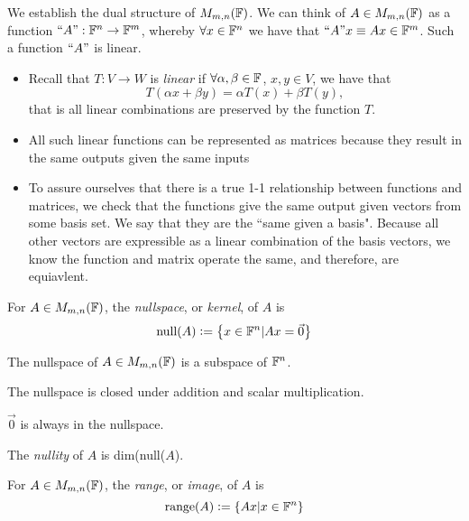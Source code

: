 \newpage

\noindent We establish the dual structure of $M_{m,n}(\mathbb F)$. We can think of $A \in M_{m,n}(\mathbb F)$ as a function $``A": \mathbb F^n \rightarrow \mathbb F^m$, whereby $\forall x \in \mathbb F^n$ we have that $``A"x \equiv Ax \in \mathbb F^m$. Such a function $``A"$ is linear.
\begin{itemize}
    \item Recall that $T: V \rightarrow W$ is \textit{linear} if $\forall \alpha, \beta \in \mathbb F$, $x, y \in V$, we have that
    $$
    T(\alpha x + \beta y) = \alpha T(x) + \beta T(y),
    $$
    that is all linear combinations are preserved by the function $T$.
    \item All such linear functions can be represented as matrices because they result in the same outputs given the same inputs
    \item To assure ourselves that there is a true 1-1 relationship between functions and matrices, we check that the functions give the same output given vectors from some basis set. We say that they are the ``same given a basis". Because all other vectors are expressible as a linear combination of the basis vectors, we know the function and matrix operate the same, and therefore, are equiavlent.
\end{itemize}

\begin{definition}
\label{def:nullspace}
For $A \in M_{m,n}(\mathbb F)$, the \textit{nullspace}, or \textit{kernel}, of $A$ is
$$
\text{null}(A) \vcentcolon= \left\{x \in \mathbb F^n | Ax = \vec{0}\right\}
$$
\end{definition}

\begin{remark*}
The nullspace of $A \in M_{m,n}(\mathbb F)$ is a subspace of $\mathbb F^n$.
\end{remark*}
\begin{remark*}
The nullspace is closed under addition and scalar multiplication.
\end{remark*}
\begin{remark*}
$\vec{0}$ is always in the nullspace.
\end{remark*}

\begin{definition}[Nullity]
\label{def:nullity}
The \textit{nullity} of $A$ is dim(null($A$).
\end{definition}

\begin{definition}
\label{def:range}
For $A \in M_{m,n}(\mathbb F)$, the \textit{range}, or \textit{image}, of $A$ is
$$
\text{range}(A) \vcentcolon= \left\{Ax | x \in \mathbb F^n \right\}
$$
\end{definition}

